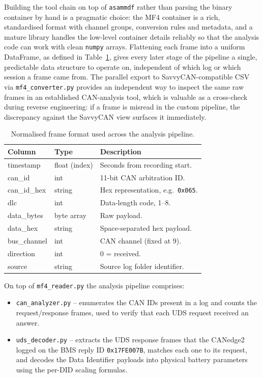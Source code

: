 \documentclass[11pt,a4paper,oneside,parskip=half]{scrreprt}
\providecommand{\hex}{}\renewcommand{\hex}[1]{\texttt{0x#1}}
\begin{document}
Building the tool chain on top of \texttt{asammdf} rather than parsing the binary container by hand is a pragmatic choice: the MF4 container is a rich, standardised format with channel groups, conversion rules and metadata, and a mature library handles the low-level container details reliably so that the analysis code can work with clean \texttt{numpy} arrays. Flattening each frame into a uniform DataFrame, as defined in Table~\ref{tab:mf4_columns}, gives every later stage of the pipeline a single, predictable data structure to operate on, independent of which log or which session a frame came from. The parallel export to SavvyCAN-compatible CSV via \texttt{mf4\_converter.py} provides an independent way to inspect the same raw frames in an established CAN-analysis tool, which is valuable as a cross-check during reverse engineering: if a frame is misread in the custom pipeline, the discrepancy against the SavvyCAN view surfaces it immediately.

\begin{table}[H]
\caption{Normalised frame format used across the analysis pipeline.}
\label{tab:mf4_columns}
\centering
\begin{tabular}{lll}
\toprule
\textbf{Column} & \textbf{Type}       & \textbf{Description} \\
\midrule
timestamp       & float (index)      & Seconds from recording start. \\
can\_id         & int                & 11-bit CAN arbitration ID. \\
can\_id\_hex    & string             & Hex representation, e.g.\ \texttt{0x065}. \\
dlc             & int                & Data-length code, 1--8. \\
data\_bytes     & byte array         & Raw payload. \\
data\_hex       & string             & Space-separated hex payload. \\
bus\_channel    & int                & CAN channel (fixed at 9). \\
direction       & int                & 0 = received. \\
source          & string             & Source log folder identifier. \\
\bottomrule
\end{tabular}
\end{table}

On top of \texttt{mf4\_reader.py} the analysis pipeline comprises:

\begin{itemize}
  \item \texttt{can\_analyzer.py} -- enumerates the CAN IDs present in a log and counts the request/response frames, used to verify that each UDS request received an answer.
  \item \texttt{uds\_decoder.py} -- extracts the UDS response frames that the CANedge2 logged on the BMS reply ID \hex{17FE007B}, matches each one to its request, and decodes the Data Identifier payloads into physical battery parameters using the per-DID scaling formulas.
\end{itemize}
\end{document}
